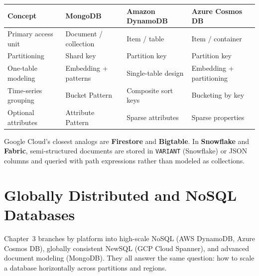 \begin{center}
\footnotesize
\begin{tabular}{@{}p{3.0cm}p{3.2cm}p{3.2cm}p{3.0cm}@{}}
\toprule
\textbf{Concept} & \textbf{MongoDB} & \textbf{Amazon DynamoDB} & \textbf{Azure Cosmos DB} \\
\midrule
Primary access unit & Document / collection & Item / table & Item / container \\
Partitioning & Shard key & Partition key & Partition key \\
One-table modeling & Embedding + patterns & Single-table design & Embedding + partitioning \\
Time-series grouping & Bucket Pattern & Composite sort keys & Bucketing by key \\
Optional attributes & Attribute Pattern & Sparse attributes & Sparse properties \\
\bottomrule
\end{tabular}
\end{center}

\noindent Google Cloud's closest analogs are \textbf{Firestore} and \textbf{Bigtable}. In
\textbf{Snowflake} and \textbf{Fabric}, semi-structured documents are stored in \texttt{VARIANT}
(Snowflake) or JSON columns and queried with path expressions rather than modeled as collections.

\section{Globally Distributed and NoSQL Databases}
%
Chapter~3 branches by platform into high-scale NoSQL (AWS DynamoDB, Azure Cosmos DB), globally
consistent NewSQL (GCP Cloud Spanner), and advanced document modeling (MongoDB). They all answer
the same question: how to scale a database horizontally across partitions and regions.

